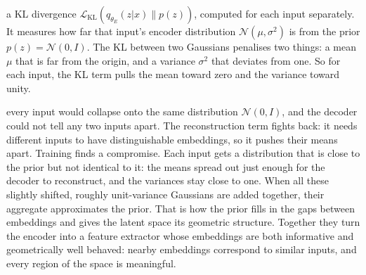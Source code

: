  a KL divergence $\mathcal{L}_{\text{KL}}(q_{\theta_E}(z|x) \| p(z))$, computed for each input separately.
It measures how far that input's encoder distribution $\mathcal{N}(\mu, \sigma^2)$ is from the prior $p(z) = \mathcal{N}(0, I)$.
The KL between two Gaussians penalises two things: a mean $\mu$ that is far from the origin, and a variance $\sigma^2$ that deviates from one.
So for each input, the KL term pulls the mean toward zero and the variance toward unity.



 every input would collapse onto the same distribution $\mathcal{N}(0, I)$, and the decoder could not tell any two inputs apart.
The reconstruction term fights back: it needs different inputs to have distinguishable embeddings, so it pushes their means apart.
Training finds a compromise.
Each input gets a distribution that is close to the prior but not identical to it: the means spread out just enough for the decoder to reconstruct, and the variances stay close to one.
When all these slightly shifted, roughly unit-variance Gaussians are added together, their aggregate approximates the prior.
That is how the prior fills in the gaps between embeddings and gives the latent space its geometric structure.
Together they turn the encoder into a feature extractor whose embeddings are both informative and geometrically well behaved: 
nearby embeddings correspond to similar inputs, and every region of the space is meaningful.

